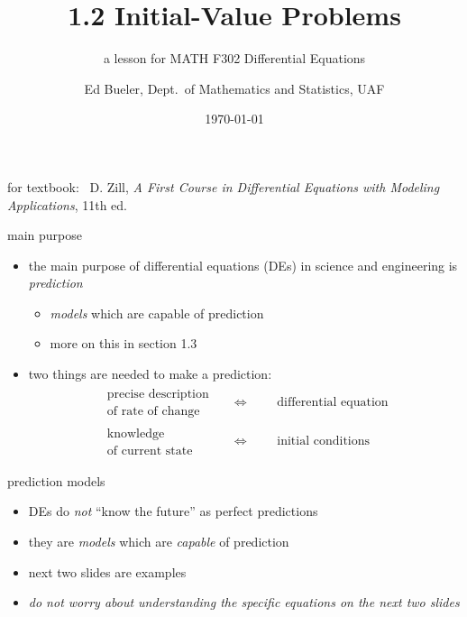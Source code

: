 \documentclass{beamer}
\title{1.2 Initial-Value Problems}
\subtitle{a lesson for MATH F302 Differential Equations}
\author{Ed Bueler, Dept.~of Mathematics and Statistics, UAF}
\date{\tiny \today}
\begin{document}


\begin{frame}
\titlepage

\centerline{\tiny for textbook: \, D. Zill, \emph{A First Course in Differential Equations with Modeling Applications}, 11th ed.}
\end{frame}


\begin{frame}{main purpose}

\begin{itemize}
\item the main purpose of differential equations (DEs) in science and engineering is \emph{prediction}
    \begin{itemize}
    \item \emph{models} which are capable of prediction
    \item more on this in section 1.3
    \end{itemize}
\item two things are needed to make a prediction:
\begin{align*}
\begin{matrix}
\text{precise description} \\
\text{of rate of change}
\end{matrix} && \iff && &\text{differential equation} \\
\begin{matrix}
\text{knowledge} \\
\text{of current state}
\end{matrix} && \iff && &\text{initial conditions}
\end{align*}
\end{itemize}
\end{frame}


\begin{frame}{prediction models}

\begin{itemize}
\item DEs do \emph{not} ``know the future'' as perfect predictions
\item they are \emph{models} which are \emph{capable} of prediction
\item next two slides are examples
\item \emph{do not worry about understanding the specific equations on the next two slides}
\end{itemize}
\end{frame}
\end{document}
